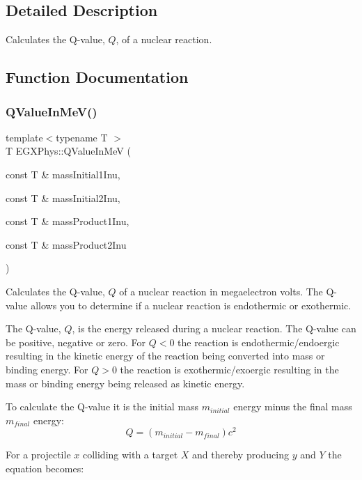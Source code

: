 \subsection{Detailed Description}
Calculates the Q-\/value, $Q$, of a nuclear reaction. 

\subsection{Function Documentation}
\mbox{\label{group___q_value_ga9de3868818a3548b4a4ab42f8c17278d}} 
\subsubsection{\texorpdfstring{Q\+Value\+In\+Me\+V()}{QValueInMeV()}}
{\footnotesize\ttfamily template$<$typename T $>$ \\
T E\+G\+X\+Phys\+::\+Q\+Value\+In\+MeV (\begin{DoxyParamCaption}\item[{const T \&}]{mass\+Initial1\+Inu,  }\item[{const T \&}]{mass\+Initial2\+Inu,  }\item[{const T \&}]{mass\+Product1\+Inu,  }\item[{const T \&}]{mass\+Product2\+Inu }\end{DoxyParamCaption})}



Calculates the Q-\/value, $Q$ of a nuclear reaction in megaelectron volts. The Q-\/value allows you to determine if a nuclear reaction is endothermic or exothermic. 

The Q-\/value, $Q$, is the energy released during a nuclear reaction. The Q-\/value can be positive, negative or zero. For $Q < 0$ the reaction is endothermic/endoergic resulting in the kinetic energy of the reaction being converted into mass or binding energy. For $Q > 0$ the reaction is exothermic/exoergic resulting in the mass or binding energy being released as kinetic energy.

To calculate the Q-\/value it is the initial mass $m_{initial}$ energy minus the final mass $m_{final}$ energy\+: \[Q = \left ( m_{initial}-m_{final}\right ) c^2\]

For a projectile $x$ colliding with a target $X$ and thereby producing $y$ and $Y$ the equation becomes\+:

